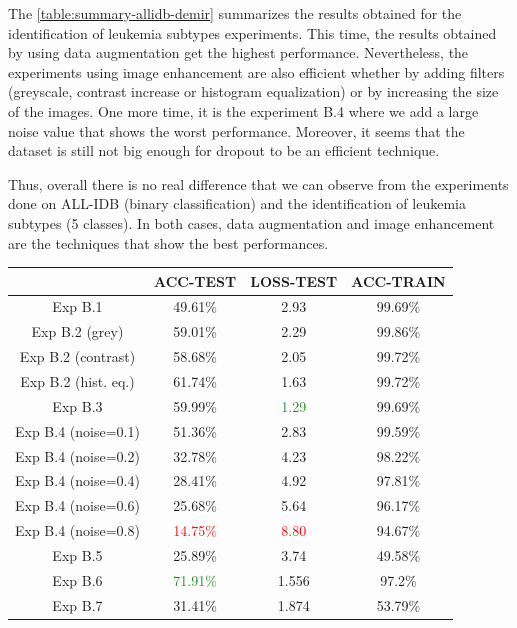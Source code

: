 \documentclass[11pt, openany]{report}
\theoremstyle{plain}
\theoremstyle{definition}
\theoremstyle{remark}
\begin{document}
\vspace{0.5cm}

The \autoref{table:summary-allidb-demir} summarizes the results obtained for the identification of leukemia subtypes experiments. This time, the results obtained by using data augmentation get the highest performance. Nevertheless, the experiments using image enhancement are also efficient whether by adding filters (greyscale, contrast increase or histogram equalization) or by increasing the size of the images. One more time, it is the experiment B.4 where we add a large noise value that shows the worst performance. Moreover, it seems that the dataset is still not big enough for dropout to be an efficient technique.

Thus, overall there is no real difference that we can observe from the experiments done on ALL-IDB (binary classification) and the identification of leukemia subtypes (5 classes). In both cases, data augmentation and image enhancement are the techniques that show the best performances.    

\begin{center}
\begin{tabular}{|c|c|c|c|}
  \hline
          & \textbf{ACC-TEST} & \textbf{LOSS-TEST} & \textbf{ACC-TRAIN} \\
  \hline
  Exp B.1 & 49.61\% & 2.93 & 99.69\% \\
  \hline
  Exp B.2 (grey) & 59.01\% & 2.29 & 99.86\%  \\ 
  Exp B.2 (contrast) & 58.68\% & 2.05 & 99.72\% \\ 
  Exp B.2 (hist. eq.) & 61.74\% & 1.63 & 99.72\% \\ 
  \hline
  Exp B.3 & 59.99\% & \textcolor{ForestGreen}{1.29} & 99.69\% \\
  \hline
  Exp B.4 (noise=0.1) & 51.36\% & 2.83 & 99.59\%  \\ 
  Exp B.4 (noise=0.2) & 32.78\% & 4.23 & 98.22\% \\ 
  Exp B.4 (noise=0.4) & 28.41\% & 4.92 & 97.81\% \\
  Exp B.4 (noise=0.6) & 25.68\% & 5.64 & 96.17\%  \\ 
  Exp B.4 (noise=0.8) & \textcolor{red}{14.75\%} & \textcolor{red}{8.80} & 94.67\% \\
  \hline 
  Exp B.5 & 25.89\% & 3.74 & 49.58\% \\
  \hline
  Exp B.6 & \textcolor{ForestGreen}{71.91\%} & 1.556 & 97.2\% \\
  \hline
  Exp B.7 & 31.41\% & 1.874 & 53.79\% \\ 
  \hline
\end{tabular}
\label{table:summary-allidb-demir}
\end{center}
\end{document}
